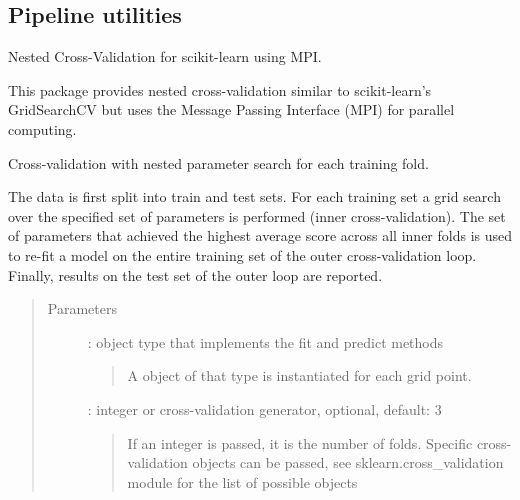 \documentclass[letterpaper,10pt,english]{sphinxmanual}
\begin{document}
\subsection{Pipeline utilities}
\label{\detokenize{api:pipeline-utilities}}\label{\detokenize{api:module-palladio.model_assessment}}
Nested Cross-Validation for scikit-learn using MPI.

This package provides nested cross-validation similar to scikit-learn's
GridSearchCV but uses the Message Passing Interface (MPI)
for parallel computing.

\begin{fulllineitems}
\label{\detokenize{api:palladio.model_assessment.ModelAssessment}}
Cross-validation with nested parameter search for each training fold.

The data is first split into  train and test sets. For each training
set a grid search over the specified set of parameters is performed
(inner cross-validation). The set of parameters that achieved the highest
average score across all inner folds is used to re-fit a model on the
entire training set of the outer cross-validation loop. Finally, results on
the test set of the outer loop are reported.
\begin{quote}\begin{description}
\item[{Parameters}] \leavevmode
{} : object type that implements the \sphinxquotedblleft{}fit\sphinxquotedblright{} and \sphinxquotedblleft{}predict\sphinxquotedblright{} methods
\begin{quote}

A object of that type is instantiated for each grid point.
\end{quote}

 : integer or cross-validation generator, optional, default: 3
\begin{quote}

If an integer is passed, it is the number of folds.
Specific cross-validation objects can be passed, see
sklearn.cross\_validation module for the list of possible objects
\end{quote}


\end{description}
\end{quote}
\end{fulllineitems}
\end{document}
